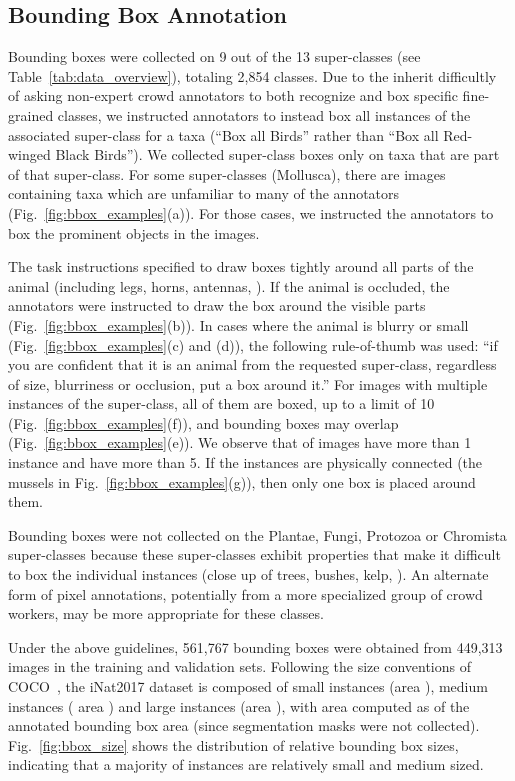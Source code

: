\documentclass[10pt,twocolumn,letterpaper]{article}
\begin{document}
\subsection{Bounding Box Annotation}
\label{sec:dataset_bboxes}
Bounding boxes were collected on 9 out of the 13 super-classes (see Table~\ref{tab:data_overview}), totaling 2,854 classes. Due to the inherit difficultly of asking non-expert crowd annotators to both recognize and box specific fine-grained classes, we instructed annotators to instead box all instances of the associated super-class for a taxa (\eg ``Box all Birds'' rather than ``Box all Red-winged Black Birds''). We collected super-class boxes only on taxa that are part of that super-class. For some super-classes (\eg Mollusca), there are images containing taxa which are unfamiliar to many of the annotators (\eg Fig.~\ref{fig:bbox_examples}(a)). For those cases, we instructed the annotators to box the prominent objects in the images.  

The task instructions specified to draw boxes tightly around all parts of the animal (including legs, horns, antennas, \etc). If the animal is occluded, the annotators were instructed to draw the box around the visible parts (\eg Fig.~\ref{fig:bbox_examples}(b)). In cases where the animal is blurry or small (\eg Fig.~\ref{fig:bbox_examples}(c) and (d)), the following rule-of-thumb was used:  ``if you are confident that it is an animal from the requested super-class, regardless of size, blurriness or occlusion, put a box around it.'' For images with multiple instances of the super-class, all of them are boxed, up to a limit of 10 (Fig.~\ref{fig:bbox_examples}(f)), and bounding boxes may overlap (Fig.~\ref{fig:bbox_examples}(e)). We observe that  of images have more than 1 instance and  have more than 5. If the instances are physically connected (\eg the mussels in Fig.~\ref{fig:bbox_examples}(g)), then only one box is placed around them. 

Bounding boxes were not collected on the Plantae, Fungi, Protozoa or Chromista super-classes because these super-classes exhibit properties that make it difficult to box the individual instances (\eg close up of trees, bushes, kelp, \etc). An alternate form of pixel annotations, potentially from a more specialized group of crowd workers, may be more appropriate for these classes. 

Under the above guidelines, 561,767 bounding boxes were obtained from 449,313 images in the training and validation sets. Following the size conventions of COCO~\cite{lin2014microsoft}, the iNat2017 dataset is composed of  small instances (area ),  medium instances ( area ) and   large instances (area ), with area computed as  of the annotated bounding box area (since segmentation masks were not collected). Fig.~\ref{fig:bbox_size} shows the distribution of relative bounding box sizes, indicating that a majority of instances are relatively small and medium sized. 
\end{document}
